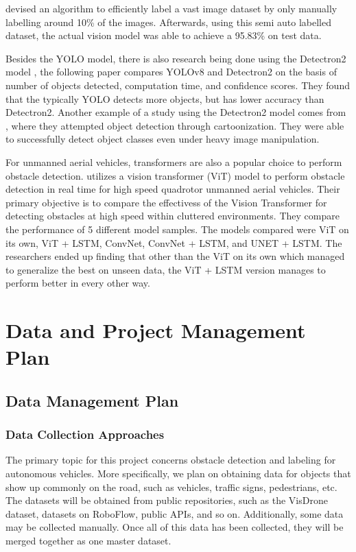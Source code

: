 \documentclass[stu,12pt,floatsintext]{apa7}
\begin{document}
\textcite{hu_novel_2019} devised an algorithm to efficiently label a vast image dataset by only manually labelling around 10\% of the images. Afterwards, using this semi auto labelled dataset, the actual vision model was able to achieve a 95.83\% on test data.

Besides the YOLO model, there is also research being done using the Detectron2 model \parencite{wu2019detectron2}, the following paper \parencite{wadhwa_comparison_2023} compares YOLOv8 and Detectron2 on the basis of number of objects detected, computation time, and confidence scores. They found that the typically YOLO detects more objects, but has lower accuracy than Detectron2. Another example of a study using the Detectron2 model comes from \textcite{abhishek_detectron2_2021}, where they attempted object detection through cartoonization. They were able to successfully detect object classes even under heavy image manipulation.

For unmanned aerial vehicles, transformers are also a popular choice to perform obstacle detection. \textcite{bhattacharya_vision_2024} utilizes a vision transformer (ViT) model to perform obstacle detection in real time for high speed quadrotor unmanned aerial vehicles. Their primary objective is to compare the effectivess of the Vision Transformer for detecting obstacles at high speed within cluttered environments. They compare the performance of 5 different model samples. The models compared were ViT on its own, ViT + LSTM, ConvNet, ConvNet + LSTM, and UNET + LSTM. The researchers ended up finding that other than the ViT on its own which managed to generalize the best on unseen data, the ViT + LSTM version manages to perform better in every other way. 


\section{Data and Project Management Plan}
\subsection{Data Management Plan}
\subsubsection{Data Collection Approaches}
The primary topic for this project concerns obstacle detection and labeling for autonomous vehicles. More specifically, we plan on obtaining data for objects that show up commonly on the road, such as vehicles, traffic signs, pedestrians, etc.
The datasets will be obtained from public repositories, such as the VisDrone dataset, datasets on RoboFlow, public APIs, and so on. Additionally, some data may be collected manually. Once all of this data has been collected, they will be merged together as one master dataset.
\end{document}
